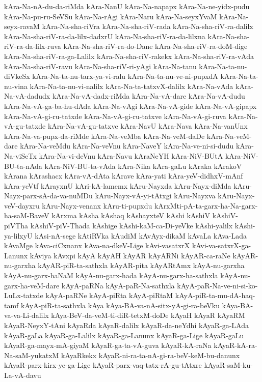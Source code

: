 {kAra-Na-nA-du-da-riMda
kAra-NanU
kAra-Na-napapx
kAra-Na-ne-yidx-pudu
kAra-Na-pu-ru-SeVSu
kAra-Na-rAgi
kAra-Naru
kAra-Na-seyxYvaM
kAra-Na-seyx-ravaM
kAra-Na-sha-riVra
kAra-Na-sha-riV-rada
kAra-Na-sha-riV-ra-dalilx
kAra-Na-sha-riV-ra-da-lilx-dadxrU
kAra-Na-sha-riV-ra-da-lilxna
kAra-Na-sha-riV-ra-da-lilx-ruva
kAra-Na-sha-riV-ra-do-Dane
kAra-Na-sha-riV-ra-doM-dige
kAra-Na-sha-riV-ra-ga-Lalilx
kAra-Na-sha-riV-rakekx
kAra-Na-sha-riV-ra-vAda
kAra-Na-sha-riV-ravu
kAra-Na-sha-riV-ri-yAgi
kAra-Na-tanu
kAra-Na-ta-nu-diVkeSx
kAra-Na-ta-nu-tarx-ya-vi-ralu
kAra-Na-ta-nu-ve-ni-pupxdA
kAra-Na-ta-nu-vina
kAra-Na-ta-nu-vi-nalilx
kAra-Na-ta-tatxvX-dalilx
kAra-Na-vAda
kAra-Na-vA-dadudx
kAra-Na-vA-dadx-riMda
kAra-Na-vA-dare
kAra-Na-vA-dudu
kAra-Na-vA-ga-ba-hu-dAda
kAra-Na-vAgi
kAra-Na-vA-gide
kAra-Na-vA-gipapx
kAra-Na-vA-gi-ru-tatxde
kAra-Na-vA-gi-ru-tatxve
kAra-Na-vA-gi-ruva
kAra-Na-vA-gu-tatxde
kAra-Na-vA-gu-tatxve
kAra-NavU
kAra-Nava
kAra-Na-vanUnx
kAra-Na-va-pupx-da-riMde
kAra-Na-veMba
kAra-Na-veM-daDe
kAra-Na-veM-dare
kAra-Na-veMdu
kAra-Na-veVnu
kAra-NaveY
kAra-Na-ve-ni-si-dudu
kAra-Na-viSeTx
kAra-Na-vi-deVnu
kAra-Navu
kAraNeYH
kAra-NiV-BUtA
kAra-NiV-BU-ta-nAda
kAra-NiV-BU-ta-vAda
kAra-Nika
kAra-gaLu
kAraka
kArakoV
kArana
kArashacx
kAra-vA-dAta
kArave
kAra-yati
kAra-yeV-didhxV-mAnf
kAra-yeVtf
kArayxnU
kAri-kA-lamemx
kAru-Nayxda
kAru-Nayx-diMda
kAru-Nayx-parx-sA-da-va-nuMDu
kAru-Nayx-vA-yi-tAtxgi
kAru-Nayxva
kAru-Nayx-veV-dayxru
kAru-Nayx-venanx
kAru-ti-pupxdu
kArxMti-pA-ta-garx-ha-Na-garx-ha-saM-BaveV
kArxma
kAsha
kAshaq
kAshayxteV
kAshi
kAshiV
kAshiV-piVTha
kAshiV-piV-Thada
kAshige
kAshi-kaM-ca-Di-yeVke
kAshi-yalilx
kAshi-ya-lilxyU
kAsi-nA-sege
kAtiRVka
kAudiM
kAvAyx-dikaM
kAvaLa
kAva-Lada
kAvaMge
kAva-ciCxnanx
kAva-na-dkeV-Lige
kAvi-vasatxrX
kAvi-va-satxrX-ga-Lanunx
kAviya
kAvxpi
kAyA
kAyAH
kAyAR
kAyARNi
kAyAR-ca-raNe
kAyAR-nu-garxha
kAyAR-piR-ta-sathxla
kAyAR-pita
kAyARtAmx
kAyA-nu-garxha
kAyA-nu-garx-haNaM
kAyA-nu-garx-hada
kAyA-nu-garx-ha-sathxla
kAyA-nu-garx-ha-veM-dare
kAyA-paRNa
kAyA-paR-Na-sathxla
kAyA-paR-Na-ve-ni-si-ko-LuLx-tatxde
kAyA-paRNe
kAyA-piRta
kAyA-piRtaM
kAyA-piR-ta-mu-dA-haq-tamf
kAyA-piR-ta-sathxla
kAya
kAya-BA-va-nA-sitx-yA-gi-ra-beVku
kAya-BA-va-va-Li-dalilx
kAya-BeV-da-veM-ti-diR-tetxM-doDe
kAyaH
kAyaR
kAyaRM
kAyaR-NeyxY-tAni
kAyaRda
kAyaR-dalilx
kAyaR-da-neYdhi
kAyaR-ga-LAda
kAyaR-gaLa
kAyaR-ga-Lalilx
kAyaR-ga-Lanunx
kAyaR-ga-Lige
kAyaR-gaLu
kAyaR-ga-mayx-mA-giyaM
kAyaR-ga-ta-vA-guva
kAyaR-kA-raNa
kAyaR-kA-ra-Na-saM-yukatxM
kAyaRkekx
kAyaR-ni-ra-ta-nA-gi-ra-beV-keM-bu-danunx
kAyaR-parx-kirx-ye-ga-Lige
kAyaR-parx-vaq-tatx-rA-gu-tAtxre
kAyaR-saM-ku-La-vA-davu
}
